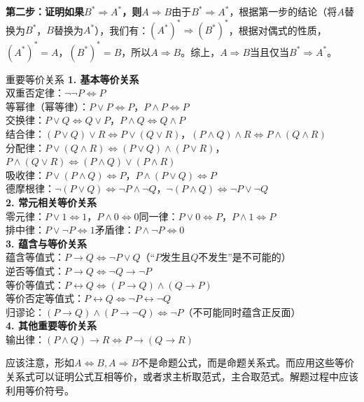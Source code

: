 \textbf{第二步：证明如果$B^* \Rightarrow A^*$，则$A \Rightarrow B$}由于$B^* \Rightarrow A^*$，根据第一步的结论（将$A$替换为$B^*$，$B$替换为$A^*$），我们有：$(A^*)^* \Rightarrow (B^*)^*$，根据对偶式的性质，$(A^*)^* = A$，$(B^*)^* = B$，所以$A \Rightarrow B$。综上，$A \Rightarrow B$当且仅当$B^* \Rightarrow A^*$。
\begin{theorem}{重要等价关系}{}
\noindent\textbf{1. 基本等价关系}\\
双重否定律：$\neg\neg P \Leftrightarrow P$\\
等幂律（幂等律）：$P \lor P \Leftrightarrow P$，$P \land P \Leftrightarrow P$\\
交换律：$P \lor Q \Leftrightarrow Q \lor P$，$P \land Q \Leftrightarrow Q \land P$\\
结合律：$(P \lor Q) \lor R \Leftrightarrow P \lor (Q \lor R)$，$(P \land Q) \land R \Leftrightarrow P \land (Q \land R)$\\
分配律：$P \lor (Q \land R) \Leftrightarrow (P \lor Q) \land (P \lor R)$，$P \land (Q \lor R) \Leftrightarrow (P \land Q) \lor (P \land R)$\\
吸收律：$P \lor (P \land Q) \Leftrightarrow P$，$P \land (P \lor Q) \Leftrightarrow P$\\
德摩根律：$\neg(P \lor Q) \Leftrightarrow \neg P \land \neg Q$，$\neg(P \land Q) \Leftrightarrow \neg P \lor \neg Q$\\
\noindent\textbf{2. 常元相关等价关系}\\
零元律：$P \lor 1 \Leftrightarrow 1$，$P \land 0 \Leftrightarrow 0$\quad 同一律：$P \lor 0 \Leftrightarrow P$，$P \land 1 \Leftrightarrow P$\\
排中律：$P \lor \neg P \Leftrightarrow 1$\quad 矛盾律：$P \land \neg P \Leftrightarrow 0$\\
\noindent\textbf{3. 蕴含与等价关系}\\
蕴含等值式：$P \rightarrow Q \Leftrightarrow \neg P \lor Q$（“$P$发生且$Q$不发生”是不可能的）\\
逆否等值式：$P \rightarrow Q \Leftrightarrow \neg Q \rightarrow \neg P$\\
等价等值式：$P \leftrightarrow Q \Leftrightarrow (P \rightarrow Q) \land (Q \rightarrow P)$\\
等价否定等值式：$P \leftrightarrow Q \Leftrightarrow \neg P \leftrightarrow \neg Q$\\
归谬论：$(P \rightarrow Q) \land (P \rightarrow \neg Q) \Leftrightarrow \neg P$（不可能同时蕴含正反面）\\
\noindent\textbf{4. 其他重要等价关系}\\
输出律：$(P \land Q) \rightarrow R \Leftrightarrow P \rightarrow (Q \rightarrow R)$
\end{theorem}
应该注意，形如$A\Leftrightarrow B,A\Rightarrow B$不是命题公式，而是命题关系式。而应用这些等价关系式可以证明公式互相等价，或者求主析取范式，主合取范式。解题过程中应该利用等价符号。

